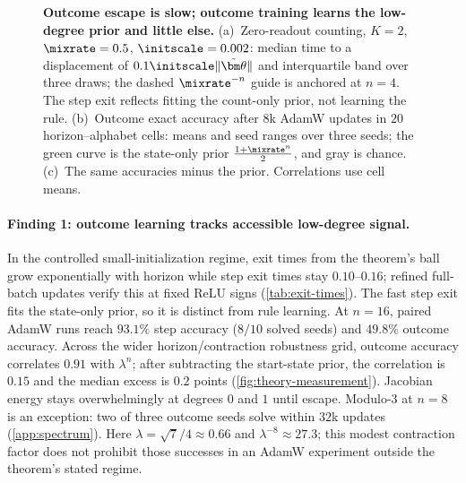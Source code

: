 \begin{figure}[t]
\centering
\resizebox{\linewidth}{!}{}
\caption{\textbf{Outcome escape is slow; outcome training learns the low-degree prior and little else.}
(a)~Zero-readout counting, $K=2$, $\mixrate=0.5$, $\initscale=0.002$: median time to a displacement of $0.1\initscale\|\tilde{\bm\theta}\|$ and interquartile band over three draws; the dashed $\mixrate^{-n}$ guide is anchored at $n=4$. The step exit reflects fitting the count-only prior, not learning the rule.
(b)~Outcome exact accuracy after $8$k AdamW updates in $20$ horizon--alphabet cells: means and seed ranges over three seeds; the green curve is the state-only prior $\frac{1+\mixrate^n}{2}$, and gray is chance.
(c)~The same accuracies minus the prior. Correlations use cell means.}
\label{fig:theory-measurement}
\label{fig:lambda-grid}
\end{figure}

\paragraph{Finding 1: outcome learning tracks accessible low-degree signal.}
In the controlled small-initialization regime, exit times from the theorem's ball grow
exponentially with horizon while step exit times stay $0.10$--$0.16$; refined full-batch
updates verify this at fixed ReLU signs (\cref{tab:exit-times}). The fast step exit fits
the state-only prior, so it is distinct from rule learning. At $n=16$, paired AdamW runs
reach $93.1\%$ step accuracy ($8/10$ solved seeds) and $49.8\%$ outcome accuracy.
Across the wider horizon/contraction robustness grid, outcome accuracy correlates $0.91$ with $\lambda^n$;
after subtracting the start-state prior, the correlation is $0.15$ and the median excess
is $0.2$ points (\cref{fig:theory-measurement}). Jacobian energy stays overwhelmingly at
degrees $0$ and $1$ until escape. Modulo-$3$ at $n=8$ is an exception: two of three
outcome seeds solve within $32$k updates (\cref{app:spectrum}). Here
$\lambda=\sqrt7/4\approx0.66$ and $\lambda^{-8}\approx27.3$; this modest contraction
factor does not prohibit those successes in an AdamW experiment outside the theorem's stated regime.

